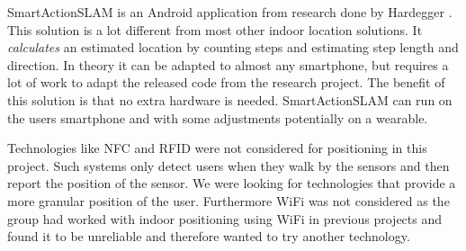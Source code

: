 SmartActionSLAM is an Android application from research done by Hardegger \etal \cite{SASLAM}. 
This solution is a lot different from most other indoor location solutions. 
It \emph{calculates} an estimated location by counting steps and estimating step length and direction. 
In theory it can be adapted to almost any smartphone, 
but requires a lot of work to adapt the released code from the research project. The benefit of this solution is that no extra hardware is needed. SmartActionSLAM can run on the users smartphone and with some adjustments potentially on a wearable.

Technologies like NFC and RFID were not considered for positioning in this project. Such systems only detect users when they walk by the sensors and then report the position of the sensor. We were looking for technologies that provide a more granular position of the user. Furthermore WiFi was not considered as the group had worked with indoor positioning using WiFi in previous projects and found it to be unreliable and therefore wanted to try another technology.



